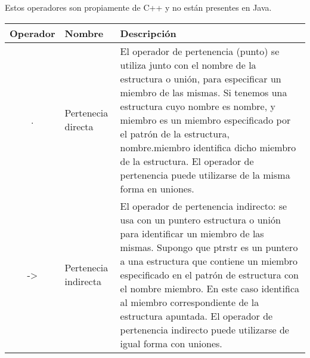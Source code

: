 Estos operadores son propiamente de C++ y no están presentes en Java. 

\begin{tabular}{|c|p{2cm}|p{11cm}|}
	\hline
	\textbf{Operador}	& \textbf{Nombre} & \textbf{Descripción}  \\
	\hline
	. & Pertenecia directa & El operador de pertenencia (punto) se utiliza junto con el nombre de la estructura o unión, para
especificar un miembro de las mismas. Si tenemos una estructura cuyo nombre es nombre,
	y miembro es un miembro especificado por el patrón de la estructura, nombre.miembro
	identifica dicho miembro de la estructura. El operador de pertenencia puede utilizarse de la
	misma forma en uniones. \\
	\hline
	-> & Pertenecia indirecta & El operador de pertenencia indirecto: se usa con un puntero estructura o unión para identificar
	un miembro de las mismas. Supongo que ptrstr es un puntero a una estructura que contiene
	un miembro especificado en el patrón de estructura con el nombre miembro. En este caso identifica al miembro correspondiente de la estructura apuntada. El operador de pertenencia
	indirecto puede utilizarse de igual forma con uniones. \\
	\hline
	
\end{tabular}